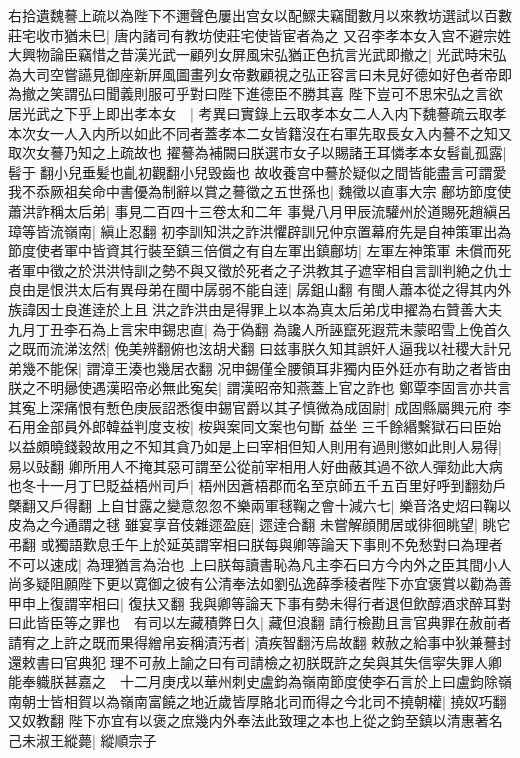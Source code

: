 右拾遺魏謩上疏以為陛下不邇聲色屢出宫女以配鰥夫竊聞數月以來教坊選試以百數莊宅收市猶未巳|{
	唐内諸司有教坊使莊宅使皆宦者為之}
又召李孝本女入宫不避宗姓大興物論臣竊惜之昔漢光武一顧列女屏風宋弘猶正色抗言光武即撤之|{
	光武時宋弘為大司空嘗讌見御座新屏風圖畫列女帝數顧視之弘正容言曰未見好德如好色者帝即為撤之笑謂弘曰聞義則服可乎對曰陛下進德臣不勝其喜}
陛下豈可不思宋弘之言欲居光武之下乎上即出孝本女　|{
	考異曰實錄上云取孝本女二人入内下魏謩疏云取孝本次女一人入内所以如此不同者蓋孝本二女皆籍沒在右軍先取長女入内謩不之知又取次女謩乃知之上疏故也}
擢謩為補闕曰朕選市女子以賜諸王耳憐孝本女髫齓孤露|{
	髫于翻小兒垂髪也齓初觀翻小兒毁齒也}
故收養宫中謩於疑似之間皆能盡言可謂愛我不忝厥祖矣命中書優為制辭以賞之謩徵之五世孫也|{
	魏徵以直事大宗}
鄜坊節度使蕭洪詐稱太后弟|{
	事見二百四十三卷太和二年}
事覺八月甲辰流驩州於道賜死趙縝呂璋等皆流嶺南|{
	縝止忍翻}
初李訓知洪之詐洪懼辟訓兄仲京置幕府先是自神策軍出為節度使者軍中皆資其行裝至鎮三倍償之有自左軍出鎮鄜坊|{
	左軍左神策軍}
未償而死者軍中徵之於洪洪恃訓之勢不與又徵於死者之子洪教其子遮宰相自言訓判絶之仇士良由是恨洪太后有異母弟在閩中孱弱不能自逹|{
	孱鉏山翻}
有閩人蕭本從之得其内外族諱因士良進逹於上且洪之詐洪由是得罪上以本為真太后弟戊申擢為右贊善大夫　九月丁丑李石為上言宋申錫忠直|{
	為于偽翻}
為讒人所誣竄死遐荒未蒙昭雪上俛首久之既而流涕泫然|{
	俛美辨翻俯也泫胡犬翻}
曰兹事朕久知其誤奸人逼我以社稷大計兄弟幾不能保|{
	謂漳王湊也幾居衣翻}
况申錫僅全腰領耳非獨内臣外廷亦有助之者皆由朕之不明曏使遇漢昭帝必無此寃矣|{
	謂漢昭帝知燕蓋上官之詐也}
鄭覃李固言亦共言其寃上深痛恨有慙色庚辰詔悉復申錫官爵以其子慎微為成固尉|{
	成固縣屬興元府}
李石用金部員外郎韓益判度支桉|{
	桉與案同文案也句斷}
益坐三千餘緡繫獄石曰臣始以益頗曉錢穀故用之不知其貪乃如是上曰宰相但知人則用有過則懲如此則人易得|{
	易以䜴翻}
卿所用人不掩其惡可謂至公從前宰相用人好曲蔽其過不欲人彈劾此大病也冬十一月丁巳貶益梧州司戶|{
	梧州因蒼梧郡而名至京師五千五百里好呼到翻劾戶槩翻又戶得翻}
上自甘露之變意忽忽不樂兩軍毬鞠之會十減六七|{
	樂音洛史炤曰鞠以皮為之今通謂之毬}
雖宴享音伎雜遝盈庭|{
	遝逹合翻}
未嘗解顔閒居或徘徊眺望|{
	眺它弔翻}
或獨語歎息壬午上於延英謂宰相曰朕每與卿等論天下事則不免愁對曰為理者不可以速成|{
	為理猶言為治也}
上曰朕每讀書恥為凡主李石曰方今内外之臣其間小人尚多疑阻願陛下更以寛御之彼有公清奉法如劉弘逸薛季稜者陛下亦宜褒賞以勸為善甲申上復謂宰相曰|{
	復扶又翻}
我與卿等論天下事有勢未得行者退但飲醇酒求醉耳對曰此皆臣等之罪也　有司以左藏積弊日久|{
	藏但浪翻}
請行檢勘且言官典罪在赦前者請宥之上許之既而果得繒帛妄稱漬汚者|{
	漬疾智翻汚烏故翻}
敕赦之給事中狄兼謩封還敕書曰官典犯理不可赦上諭之曰有司請檢之初朕既許之矣與其失信寜失罪人卿能奉軄朕甚嘉之　十二月庚戌以華州刺史盧鈞為嶺南節度使李石言於上曰盧鈞除嶺南朝士皆相賀以為嶺南富饒之地近歲皆厚賂北司而得之今北司不撓朝權|{
	撓奴巧翻又奴教翻}
陛下亦宜有以褒之庶幾内外奉法此致理之本也上從之鈞至鎮以清惠著名　己未淑王縱薨|{
	縱順宗子}


